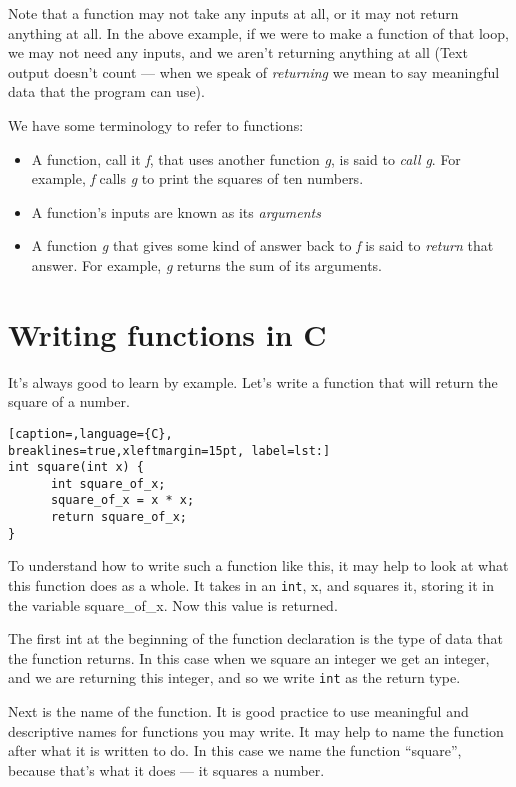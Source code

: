 Note that a function may not take any inputs at all, or it may not return
anything at all. In the above example, if we were to make a function of that
loop, we may not need any inputs, and we aren't returning anything at all (Text
output doesn't count --- when we speak of \emph{returning} we mean to say
meaningful data that the program can use).

We have some terminology to refer to functions:
\begin{itemize}
	\item A function, call it \emph{f}, that uses another function \emph{g}, is
said to \emph{call} \emph{g}. For example, \emph{f} calls \emph{g} to print the
squares of ten numbers.
	\item A function's inputs are known as its \emph{arguments}
	\item A function \emph{g} that gives some kind of answer back to \emph{f}
is said to \emph{return} that answer. For example, \emph{g} returns the sum of
its arguments.
\end{itemize}

\section{Writing functions in C}
It's always good to learn by example. Let's write a function that will return the square of a number.

\lstset{basicstyle=\scriptsize, numbers=left, captionpos=b, tabsize=4}
\begin{lstlisting}[caption=,language={C},
breaklines=true,xleftmargin=15pt, label=lst:]
int square(int x) {
	  int square_of_x;
	  square_of_x = x * x;
	  return square_of_x;
}
\end{lstlisting}

To understand how to write such a function like this, it may help to look at
what this function does as a whole. It takes in an \texttt{int}, x, and squares
it, storing it in the variable square\_of\_x. Now this value is returned. 

The first int at the beginning of the function declaration is the type of data
that the function returns. In this case when we square an integer we get an
integer, and we are returning this integer, and so we write \texttt{int} as the
return type.

Next is the name of the function. It is good practice to use meaningful and
descriptive names for functions you may write. It may help to name the function
after what it is written to do. In this case we name the function ``square'',
because that's what it does --- it squares a number.

